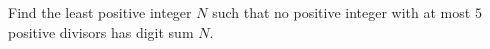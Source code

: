 Find the least positive integer $N$ such that no positive integer with at most $5$ positive divisors has digit sum $N$.
